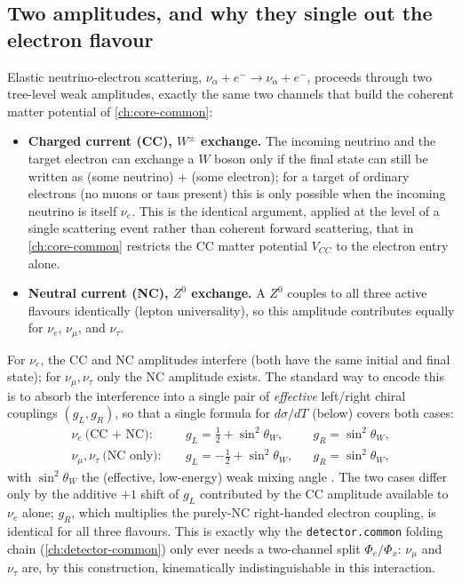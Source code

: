\begin{theorybox}
\subsection*{Two amplitudes, and why they single out the electron flavour}
Elastic neutrino-electron scattering, $\nu_\alpha + e^- \to \nu_\alpha +
e^-$, proceeds through two tree-level weak amplitudes, exactly the same two
channels that build the coherent matter potential of \cref{ch:core-common}:
\begin{itemize}
  \item \textbf{Charged current (CC), $W^\pm$ exchange.} The incoming
    neutrino and the target electron can exchange a $W$ boson only if the
    final state can still be written as (some neutrino) + (some electron);
    for a target of ordinary electrons (no muons or taus present) this is
    only possible when the incoming neutrino is itself $\nu_e$. This is the
    identical argument, applied at the level of a single scattering event
    rather than coherent forward scattering, that in \cref{ch:core-common}
    restricts the CC matter potential $V_{CC}$ to the electron entry alone.
  \item \textbf{Neutral current (NC), $Z^0$ exchange.} A $Z^0$ couples to
    all three active flavours identically (lepton universality), so this
    amplitude contributes equally for $\nu_e$, $\nu_\mu$, and $\nu_\tau$.
\end{itemize}
For $\nu_e$, the CC and NC amplitudes interfere (both have the same initial
and final state); for $\nu_\mu,\nu_\tau$ only the NC amplitude exists. The
standard way to encode this is to absorb the interference into a single pair
of \emph{effective} left/right chiral couplings $(g_L,g_R)$, so that a
single formula for $d\sigma/dT$ (below) covers both cases:
\begin{align}
  \nu_e\ \text{(CC + NC)}:\quad
    & g_L = \tfrac12 + \sin^2\theta_W, && g_R = \sin^2\theta_W, \\
  \nu_\mu,\nu_\tau\ \text{(NC only)}:\quad
    & g_L = -\tfrac12 + \sin^2\theta_W, && g_R = \sin^2\theta_W,
\end{align}
with $\sin^2\theta_W$ the (effective, low-energy) weak mixing angle
\parencite{ParticleDataGroup}. The two cases differ only by the additive
$+1$ shift of $g_L$ contributed by the CC amplitude available to $\nu_e$
alone; $g_R$, which multiplies the purely-NC right-handed electron coupling,
is identical for all three flavours. This is exactly why the
\texttt{detector.common} folding chain (\cref{ch:detector-common}) only ever
needs a two-channel split $\Phi_e/\Phi_x$: $\nu_\mu$ and $\nu_\tau$ are, by
this construction, kinematically indistinguishable in this interaction.


\end{theorybox}
